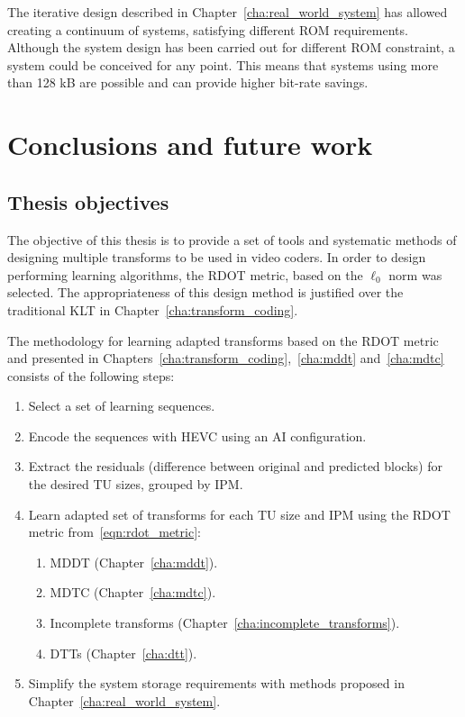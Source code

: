 \documentclass[11pt,a4paper,openright,twoside]{book}
\numberwithin{equation}{section} %
\numberwithin{figure}{section} %
\numberwithin{table}{section} %
\begin{document}
The iterative design described in Chapter~\ref{cha:real_world_system} has
allowed creating a continuum of systems, satisfying different \acs{ROM}
requirements.
Although the system design has been carried out for different \acs{ROM}
constraint, a system could be conceived for any point.
This means that systems using more than 128 kB are possible and can provide
higher bit-rate savings.

\chapter{Conclusions and future work}
\label{cha:conclusions_and_future_work}

\pagestyle{empty}

\section*{Thesis objectives}
\label{sec:thesis_objectives}

The objective of this thesis is to provide a set of tools and systematic
methods of designing multiple transforms to be used in video coders.
In order to design performing learning algorithms, the \ac{RDOT} metric, based
on the $\ell_0$ norm was selected.
The appropriateness of this design method is justified over the traditional
\ac{KLT} in Chapter~\ref{cha:transform_coding}.

The methodology for learning adapted transforms based on the \ac{RDOT} metric
and presented in Chapters~\ref{cha:transform_coding},~\ref{cha:mddt}
and~\ref{cha:mdtc} consists of the following steps:
\begin{enumerate}
	\item Select a set of learning sequences.
	\item Encode the sequences with \ac{HEVC} using an \ac{AI} configuration.
	\item Extract the residuals (difference between original and predicted
		blocks) for the desired \ac{TU} sizes, grouped by \ac{IPM}.
	\item Learn adapted set of transforms for each \ac{TU} size and \ac{IPM}
		using the \acs{RDOT} metric from~\eqref{eqn:rdot_metric}:
		\begin{enumerate}
			\item \acs{MDDT} (Chapter~\ref{cha:mddt}).
			\item \acs{MDTC} (Chapter~\ref{cha:mdtc}).
			\item Incomplete transforms
				(Chapter~\ref{cha:incomplete_transforms}).
			\item \acp{DTT} (Chapter~\ref{cha:dtt}).
		\end{enumerate}
	\item Simplify the system storage requirements with methods proposed in
		Chapter~\ref{cha:real_world_system}.
\end{enumerate}
\end{document}
